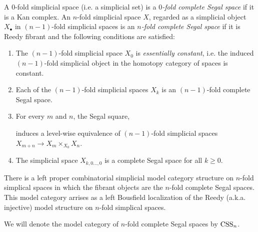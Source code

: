 \documentclass{amsart}
\begin{document}
\begin{definition}
		A $0$-fold simplicial space (i.e. a simplicial set) is a {\em $0$-fold complete Segal space} if it is a Kan complex. An $n$-fold simplicial space $X$, regarded as a simplicial object $X_\bullet$ in $(n-1)$-fold simplicial spaces is an {\em $n$-fold complete Segal space} if it is Reedy fibrant and the following conditions are satisfied:
		\begin{enumerate}
			\item The $(n-1)$-fold simplicial space $X_0$ is {\em essentially constant}, i.e. the induced $(n-1)$-fold simplicial object in the homotopy category of spaces is constant. 
			\item Each of the $(n-1)$-fold simplicial spaces $X_k$ is an $(n-1)$-fold complete Segal space.
			\item For every $m$ and $n$, the Segal square,
			\begin{center}
			\end{center}
			induces a level-wise 
			equivalence of $(n-1)$-fold simplicial spaces $X_{m+n} \to X_m \times_{X_0} X_n$.
			\item The simplicial space $X_{k, 0 \dots, 0}$ is a complete Segal space for all $k\geq 0$. 
		\end{enumerate}
\end{definition}

\begin{theorem}
	There is a left proper combinatorial simplicial model category structure on $n$-fold simplical spaces in which the fibrant objects are the $n$-fold complete Segal spaces. This model category arrises as a left Bousfield localization of the Reedy (a.k.a. injective) model structure on $n$-fold simplical spaces. 
\end{theorem}

\noindent We will denote the model category of $n$-fold complete Segal spaces by $\mathrm{CSS}_n$.  
\end{document}
